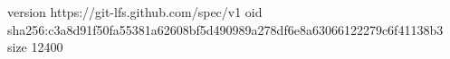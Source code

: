 version https://git-lfs.github.com/spec/v1
oid sha256:c3a8d91f50fa55381a62608bf5d490989a278df6e8a63066122279c6f41138b3
size 12400
